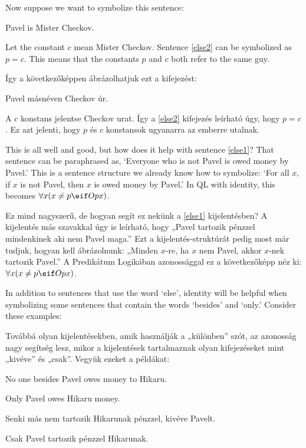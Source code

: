 Now suppose we want to symbolize this sentence:
\begin{earg}
\item[\ex{else2}] Pavel is Mister Checkov.
\end{earg}
Let the constant $c$ mean Mister Checkov. Sentence \ref{else2} can be symbolized as $p=c$. This means that the constants $p$ and $c$ both refer to the same guy.

Így a következőképpen ábrázolhatjuk ezt a kifejezést:
\begin{earg}
\item[\ex{else2}] Pavel másnéven Checkov úr.
\end{earg}
A $c$ konstans jelentse Checkov urat. Így a \ref{else2} kifejezés leírható úgy, hogy $p=c$. Ez azt jelenti, hogy $p$ és $c$ konstansok ugyanarra az emberre utalnak.

This is all well and good, but how does it help with sentence \ref{else1}? That sentence can be paraphrased as, `Everyone who is not Pavel is owed money by Pavel.' This is a sentence structure we already know how to symbolize: `For all $x$, if $x$ is not Pavel, then $x$ is owed money by Pavel.' In QL with identity, this becomes $\forall x (x\neq p \eif Opx)$.

Ez mind nagyszerű, de hogyan segít ez nekünk a \ref{else1} kijelentésben? A kijelentés más szavakkal úgy is leírható, hogy „Pavel tartozik pénzzel mindenkinek aki nem Pavel maga.” Ezt a kijelentés-struktúrát pedig most már tudjuk, hogyan kell ábrázolnunk: „Minden $x$-re, ha $x$ nem Pavel, akkor $x$-nek tartozik Pavel.” A Predikátum Logikában azonossággal ez a következőképp néz ki: $\forall x (x\neq p \eif Opx)$.

In addition to sentences that use the word `else', identity will be helpful when symbolizing some sentences that contain the words `besides' and `only.' Consider these examples:

Továbbá olyan kijelentésekben, amik használják a „különben” szót, az azonosság nagy segítség lesz, mikor a kijelentések tartalmaznak olyan kifejezéseket mint „kivéve” és „csak”. Vegyük ezeket a példákat:

\begin{earg}
\item[\ex{else3}] No one besides Pavel owes money to Hikaru.
\item[\ex{else4}] Only Pavel owes Hikaru money.
\end{earg}

\begin{earg}
\item[\ex{else3}] Senki más nem tartozik Hikarunak pénzzel, kivéve Pavelt.
\item[\ex{else4}] Csak Pavel tartozik pénzzel Hikarunak.
\end{earg}

